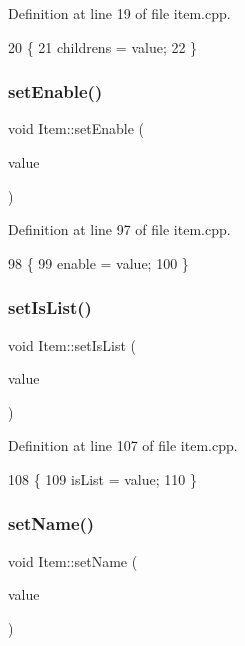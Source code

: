 Definition at line 19 of file item.\+cpp.


\begin{DoxyCode}
20 \{
21     childrens = value;
22 \}
\end{DoxyCode}
\mbox{\label{class_item_a058f352e4efb4ba66a85c09e5c59fc9a}} 
\subsubsection{\texorpdfstring{set\+Enable()}{setEnable()}}
{\footnotesize\ttfamily void Item\+::set\+Enable (\begin{DoxyParamCaption}\item[{bool}]{value }\end{DoxyParamCaption})}



Definition at line 97 of file item.\+cpp.


\begin{DoxyCode}
98 \{
99     enable = value;
100 \}
\end{DoxyCode}
\mbox{\label{class_item_aa289228a65c92ec36e1098b2041ab09a}} 
\subsubsection{\texorpdfstring{set\+Is\+List()}{setIsList()}}
{\footnotesize\ttfamily void Item\+::set\+Is\+List (\begin{DoxyParamCaption}\item[{bool}]{value }\end{DoxyParamCaption})}



Definition at line 107 of file item.\+cpp.


\begin{DoxyCode}
108 \{
109     isList = value;
110 \}
\end{DoxyCode}
\mbox{\label{class_item_a4471207d9b41c03f59f8e8bd2c385cba}} 
\subsubsection{\texorpdfstring{set\+Name()}{setName()}}
{\footnotesize\ttfamily void Item\+::set\+Name (\begin{DoxyParamCaption}\item[{const Q\+String \&}]{value }\end{DoxyParamCaption})}



